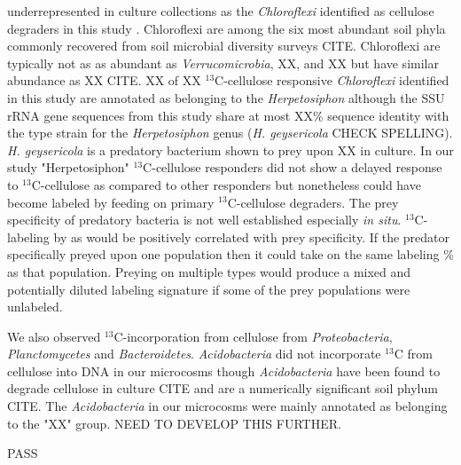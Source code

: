 underrepresented in culture collections as the \textit{Chloroflexi} identified
as cellulose degraders in this study \citep{Schellenberger_2010}.
Chloroflexi are among the six most abundant soil phyla commonly recovered from
soil microbial diversity surveys CITE. Chloroflexi are typically not as as
abundant as \textit{Verrucomicrobia}, XX, and XX but have similar abundance as
XX CITE. XX of XX $^{13}$C-cellulose responsive \textit{Chloroflexi} identified
in this study are annotated as belonging to the \textit{Herpetosiphon} although
the SSU rRNA gene sequences from this study share at most XX\% sequence
identity with the type strain for the \textit{Herpetosiphon} genus (\textit{H.
geysericola} CHECK SPELLING). \textit{H. geysericola} is a predatory bacterium
shown to prey upon XX in culture. In our study "Herpetosiphon"
$^{13}$C-cellulose responders did not show a delayed response to
$^{13}$C-cellulose as compared to other responders but nonetheless could have
become labeled by feeding on primary $^{13}$C-cellulose degraders. The prey
specificity of predatory bacteria is not well established especially \textit{in
situ}. $^{13}$C-labeling by as would be positively correlated with prey
specificity. If the predator specifically preyed upon one population then it
could take on the same labeling \% as that population. Preying on multiple
types would produce a mixed and potentially diluted labeling signature if some
of the prey populations were unlabeled. 

We also observed $^{13}$C-incorporation from cellulose from \textit{Proteobacteria}, \textit{Planctomycetes} and \textit{Bacteroidetes}. 
\textit{Acidobacteria} did not incorporate $^{13}$C from cellulose into DNA in
our microcosms though \textit{Acidobacteria} have been found to degrade
cellulose in culture CITE and are a numerically significant soil phylum CITE.
The \textit{Acidobacteria} in our microcosms were mainly annotated as belonging
to the "XX" group. NEED TO DEVELOP THIS FURTHER.

PASS

